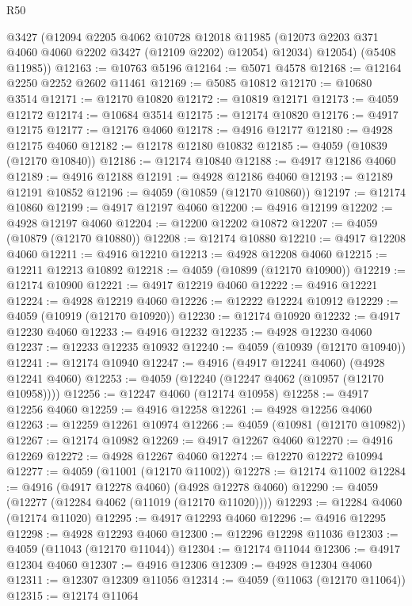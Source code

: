 \begin{lexlean}{R50}
\begin{coremodule}
        @3427
        (@12094
          @2205
          @4062
          @10728
          @12018
          @11985
          (@12073 @2203 @371 @4060 @4060 @2202 @3427 (@12109 @2202) @12054)
          @12034)
        @12054)
      (@5408 @11985))
@12163 := @10763 @5196
@12164 := @5071 @4578
@12168 := @12164 @2250 @2252 @2602 @11461
@12169 := @5085 @10812
@12170 := @10680 @3514
@12171 := @12170 @10820
@12172 := @10819 @12171
@12173 := @4059 @12172
@12174 := @10684 @3514
@12175 := @12174 @10820
@12176 := @4917 @12175
@12177 := @12176 @4060
@12178 := @4916 @12177
@12180 := @4928 @12175 @4060
@12182 := @12178 @12180 @10832
@12185 := @4059 (@10839 (@12170 @10840))
@12186 := @12174 @10840
@12188 := @4917 @12186 @4060
@12189 := @4916 @12188
@12191 := @4928 @12186 @4060
@12193 := @12189 @12191 @10852
@12196 := @4059 (@10859 (@12170 @10860))
@12197 := @12174 @10860
@12199 := @4917 @12197 @4060
@12200 := @4916 @12199
@12202 := @4928 @12197 @4060
@12204 := @12200 @12202 @10872
@12207 := @4059 (@10879 (@12170 @10880))
@12208 := @12174 @10880
@12210 := @4917 @12208 @4060
@12211 := @4916 @12210
@12213 := @4928 @12208 @4060
@12215 := @12211 @12213 @10892
@12218 := @4059 (@10899 (@12170 @10900))
@12219 := @12174 @10900
@12221 := @4917 @12219 @4060
@12222 := @4916 @12221
@12224 := @4928 @12219 @4060
@12226 := @12222 @12224 @10912
@12229 := @4059 (@10919 (@12170 @10920))
@12230 := @12174 @10920
@12232 := @4917 @12230 @4060
@12233 := @4916 @12232
@12235 := @4928 @12230 @4060
@12237 := @12233 @12235 @10932
@12240 := @4059 (@10939 (@12170 @10940))
@12241 := @12174 @10940
@12247 := @4916 (@4917 @12241 @4060) (@4928 @12241 @4060)
@12253 := @4059 (@12240 (@12247 @4062 (@10957 (@12170 @10958))))
@12256 := @12247 @4060 (@12174 @10958)
@12258 := @4917 @12256 @4060
@12259 := @4916 @12258
@12261 := @4928 @12256 @4060
@12263 := @12259 @12261 @10974
@12266 := @4059 (@10981 (@12170 @10982))
@12267 := @12174 @10982
@12269 := @4917 @12267 @4060
@12270 := @4916 @12269
@12272 := @4928 @12267 @4060
@12274 := @12270 @12272 @10994
@12277 := @4059 (@11001 (@12170 @11002))
@12278 := @12174 @11002
@12284 := @4916 (@4917 @12278 @4060) (@4928 @12278 @4060)
@12290 := @4059 (@12277 (@12284 @4062 (@11019 (@12170 @11020))))
@12293 := @12284 @4060 (@12174 @11020)
@12295 := @4917 @12293 @4060
@12296 := @4916 @12295
@12298 := @4928 @12293 @4060
@12300 := @12296 @12298 @11036
@12303 := @4059 (@11043 (@12170 @11044))
@12304 := @12174 @11044
@12306 := @4917 @12304 @4060
@12307 := @4916 @12306
@12309 := @4928 @12304 @4060
@12311 := @12307 @12309 @11056
@12314 := @4059 (@11063 (@12170 @11064))
@12315 := @12174 @11064

\end{coremodule}
\end{lexlean}
